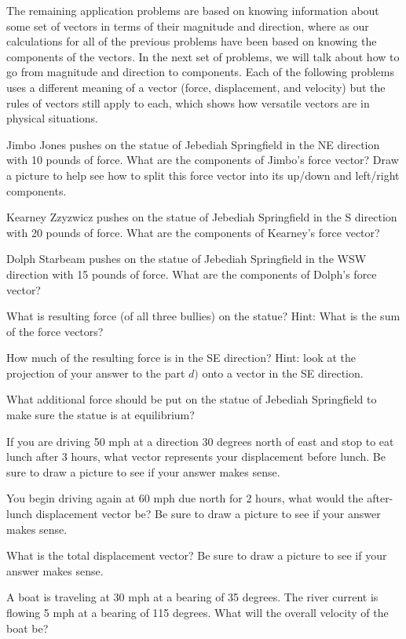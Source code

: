 The remaining application problems are based on knowing information about some set of vectors in terms of their magnitude and direction, where as our calculations for all of the previous problems have been based on knowing the components of the vectors. In the next set of problems, we will talk about how to go from magnitude and direction to components. Each of the following problems uses a different meaning of a vector (force, displacement, and velocity) but the rules of vectors still apply to each, which shows how versatile vectors are in physical situations.

\bq \be
\item Jimbo Jones pushes on the statue of Jebediah Springfield in the NE direction with 10 pounds of force. What are the components of Jimbo's force vector? Draw a picture to help see how to split this force vector into its up/down and left/right components.
\item Kearney Zzyzwicz pushes on the statue of Jebediah Springfield in the S direction with 20 pounds of force. What are the components of Kearney's force vector?
\item Dolph Starbeam pushes on the statue of Jebediah Springfield in the WSW direction with 15 pounds of force. What are the components of Dolph's force vector?
\item What is resulting force (of all three bullies) on the statue? Hint: What is the sum of the force vectors?
\item How much of the resulting force is in the SE direction? Hint: look at the projection of your answer to the part $d)$ onto a vector in the SE direction.
\item What additional force should be put on the statue of Jebediah Springfield to make sure the statue is at equilibrium?
\ee
\eq

\bq \be
\item If you are driving 50 mph at a direction 30 degrees north of east and stop to eat lunch after 3 hours, what vector represents your displacement before lunch. Be sure to draw a picture to see if your answer makes sense.
\item You begin driving again at 60 mph due north for 2 hours, what would the after-lunch displacement vector be? Be sure to draw a picture to see if your answer makes sense.
\item What is the total displacement vector? Be sure to draw a picture to see if your answer makes sense.
\ee
\eq

\bq A boat is traveling at 30 mph at a bearing of 35 degrees. The river current is flowing 5 mph at a bearing of 115 degrees. What will the overall velocity of the boat be?
\eq

